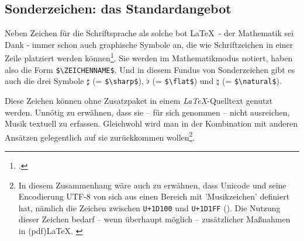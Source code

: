 %
%
%



\subsection{Sonderzeichen: das Standardangebot}

Neben Zeichen für die Schriftsprache als solche bot \LaTeX\ - der
Mathematik sei Dank - immer schon auch graphische Symbole an, die wie
Schriftzeichen in einer Zeile platziert werden können\footcite[vgl.][543ff et
passim]{MitGoo2005a}. Sie werden im Mathematikmodus notiert, haben also die Form
\texttt{\small \$\textbackslash{ZEICHENNAME}\$}. Und in diesem Fundus von Sonderzeichen
gibt es auch die drei Symbole $\sharp$ (= \texttt{\small \$\textbackslash{sharp}\$}),
$\flat$ (= \texttt{\small \$\textbackslash{flat}\$}) und $\natural$ (=
\texttt{\small \$\textbackslash{natural}\$}).

Diese Zeichen können ohne Zusatzpaket in einem \textit{LaTeX}-Quelltext genutzt
werden. Unnötig zu erwähnen, dass sie -- für sich genommen -- nicht ausreichen,
Musik textuell zu erfassen. Gleichwohl wird man in der Kombination mit anderen
Ansätzen gelegentlich auf sie zurückkommen wollen\footnote{In diesem
Zusammenhang wäre auch zu erwähnen, dass Unicode und seine Encodierung UTF-8 von
sich aus einen Bereich mit 'Musikzeichen' definiert hat, nämlich die Zeichen
zwischen \texttt{U+1D100} und \texttt{U+1D1FF} (\cite[Vgl. dazu][\nopage
wp.]{Koellerwirth2015a}). Die Nutzung dieser Zeichen bedarf -- wenn überhaupt
möglich -- zusätzlicher Maßnahmen in (pdf)\LaTeX. \cite[Zum Zusammenhang
zwischen Unicode und UTF( vgl.][\nopage wp.]{Kuhn2019a} }.

%
